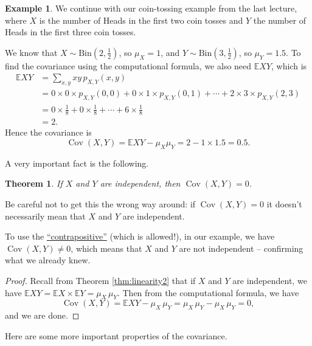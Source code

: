 \documentclass[
  a4paper,
]{book}
\newtheorem{theorem}{Theorem}[chapter]
\theoremstyle{definition}
\theoremstyle{definition}
\newtheorem{example}{Example}[chapter]
\theoremstyle{definition}
\theoremstyle{definition}
\theoremstyle{remark}
\begin{document}
\begin{example}
We continue with our coin-tossing example from the last lecture, where \(X\) is the number of Heads in the first two coin tosses and \(Y\) the number of Heads in the first three coin tosses.

We know that \(X \sim \text{Bin}(2, \frac12)\), so \(\mu_X = 1\), and \(Y \sim \text{Bin}(3, \frac12)\), so \(\mu_Y = 1.5\). To find the covariance using the computational formula, we also need \(\mathbb EXY\), which is
\begin{align*}
\mathbb EXY &= \sum_{x,y} xy\, p_{X,Y}(x,y) \\
  &= 0\times 0\times p_{X,Y}(0,0) + 0 \times 1 \times p_{X,Y}(0,1) + \cdots + 2\times 3 \times p_{X,Y}(2,3) \\
  &= 0 \times \tfrac18 + 0 \times \tfrac18 + \cdots + 6 \times \tfrac18 \\
  &= 2.
\end{align*}
Hence the covariance is
\[ \operatorname{Cov}(X,Y) = \mathbb EXY - \mu_X\mu_Y = 2 - 1 \times 1.5 = 0.5 .\]
\end{example}

A very important fact is the following.

\begin{theorem}
If \(X\) and \(Y\) are independent, then \(\operatorname{Cov}(X,Y) = 0\).
\end{theorem}

Be careful not to get this the wrong way around: if \(\operatorname{Cov}(X,Y) = 0\) it doesn't necessarily mean that \(X\) and \(Y\) are independent.

To use the \href{https://www.varsitytutors.com/hotmath/hotmath_help/topics/converse-inverse-contrapositive}{``contrapositive''} (which is allowed!), in our example, we have \(\operatorname{Cov}(X,Y) \neq 0\), which means that \(X\) and \(Y\) are not independent -- confirming what we already knew.

\begin{proof}
Recall from Theorem \ref{thm:linearity2} that if \(X\) and \(Y\) are independent, we have \(\mathbb EXY = \mathbb EX \times \mathbb EY = \mu_X \, \mu_Y\). Then from the computational formula, we have
\[ \operatorname{Cov}(X,Y) = \mathbb EXY - \mu_X\,\mu_Y = \mu_X\,\mu_Y - \mu_X\,\mu_Y = 0, \]
and we are done.
\end{proof}

Here are some more important properties of the covariance.
\end{document}
